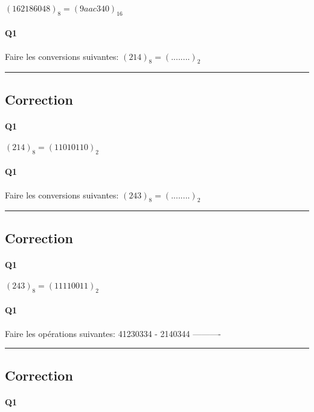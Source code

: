 $(162186048)_{8} = (9aac340)_{16}$
\pagebreak

\paragraph{Q1}

Faire les conversions suivantes: 
$(214)_{8} = (........)_{2}$

\hrule width 1\linewidth
\pagebreak

\subsection{Correction}


\paragraph{Q1}

$(214)_{8} = (11010110)_{2}$
\pagebreak

\paragraph{Q1}

Faire les conversions suivantes: 
$(243)_{8} = (........)_{2}$

\hrule width 1\linewidth
\pagebreak

\subsection{Correction}


\paragraph{Q1}

$(243)_{8} = (11110011)_{2}$
\pagebreak

\paragraph{Q1}

Faire les opérations suivantes: 
  41230334
-  2140344
----------



\hrule width 1\linewidth
\pagebreak

\subsection{Correction}


\paragraph{Q1}

